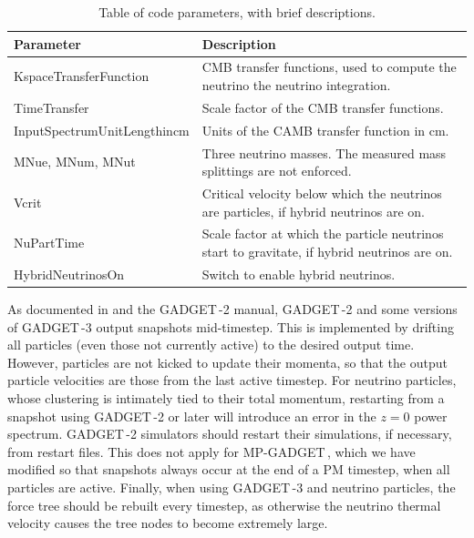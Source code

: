\documentclass[useAMS, usenatbib]{mnras}
\newcommand{\gadget}{{\small GADGET\,}}
\begin{document}
\begin{table}
\begin{center}
\begin{tabular}{|l|l|}
\hline
    Parameter & Description \\
\hline
KspaceTransferFunction   & CMB transfer functions, used to compute the neutrino the neutrino integration. \\
TimeTransfer             & Scale factor of the CMB transfer functions. \\
InputSpectrumUnitLengthincm   & Units of the CAMB transfer function in cm. \\
MNue, MNum, MNut &  Three neutrino masses. The measured mass splittings are not enforced. \\
Vcrit            & Critical velocity below which the neutrinos are particles, if hybrid neutrinos are on. \\
NuPartTime       & Scale factor at which the particle neutrinos start to gravitate, if hybrid neutrinos are on. \\
HybridNeutrinosOn       & Switch to enable hybrid neutrinos. \\
\hline
\end{tabular}
\end{center}
\caption{Table of code parameters, with brief descriptions.}
\label{tab:parameters}
\end{table}

As documented in \cite{Springel_2005} and the \gadget-2 manual, \gadget-2 and some versions of \gadget-3 output snapshots mid-timestep. This is implemented by drifting all particles (even those not currently active) to the desired output time. However, particles are not kicked to update their momenta, so that the output particle velocities are those from the last active timestep. For neutrino particles, whose clustering is intimately tied to their total momentum, restarting from a snapshot using \gadget-2 or later will introduce an error in the $z=0$ power spectrum. \gadget-2 simulators should restart their simulations, if necessary, from restart files. This does not apply for MP-\gadget, which we have modified so that snapshots always occur at the end of a PM timestep, when all particles are active. Finally, when using \gadget-3 and neutrino particles, the force tree should be rebuilt every timestep, as otherwise the neutrino thermal velocity causes the tree nodes to become extremely large.
\end{document}
